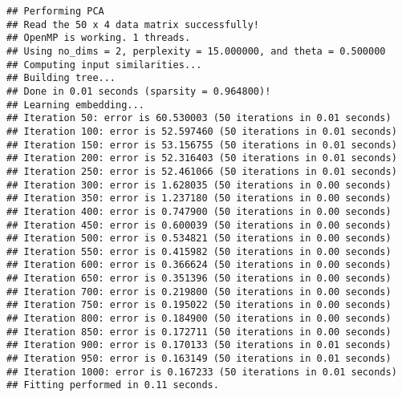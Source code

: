 \documentclass[
]{article}
\begin{document}
\begin{verbatim}
## Performing PCA
## Read the 50 x 4 data matrix successfully!
## OpenMP is working. 1 threads.
## Using no_dims = 2, perplexity = 15.000000, and theta = 0.500000
## Computing input similarities...
## Building tree...
## Done in 0.01 seconds (sparsity = 0.964800)!
## Learning embedding...
## Iteration 50: error is 60.530003 (50 iterations in 0.01 seconds)
## Iteration 100: error is 52.597460 (50 iterations in 0.01 seconds)
## Iteration 150: error is 53.156755 (50 iterations in 0.01 seconds)
## Iteration 200: error is 52.316403 (50 iterations in 0.01 seconds)
## Iteration 250: error is 52.461066 (50 iterations in 0.01 seconds)
## Iteration 300: error is 1.628035 (50 iterations in 0.00 seconds)
## Iteration 350: error is 1.237180 (50 iterations in 0.00 seconds)
## Iteration 400: error is 0.747900 (50 iterations in 0.00 seconds)
## Iteration 450: error is 0.600039 (50 iterations in 0.00 seconds)
## Iteration 500: error is 0.534821 (50 iterations in 0.00 seconds)
## Iteration 550: error is 0.415982 (50 iterations in 0.00 seconds)
## Iteration 600: error is 0.366624 (50 iterations in 0.00 seconds)
## Iteration 650: error is 0.351396 (50 iterations in 0.00 seconds)
## Iteration 700: error is 0.219800 (50 iterations in 0.00 seconds)
## Iteration 750: error is 0.195022 (50 iterations in 0.00 seconds)
## Iteration 800: error is 0.184900 (50 iterations in 0.00 seconds)
## Iteration 850: error is 0.172711 (50 iterations in 0.00 seconds)
## Iteration 900: error is 0.170133 (50 iterations in 0.01 seconds)
## Iteration 950: error is 0.163149 (50 iterations in 0.01 seconds)
## Iteration 1000: error is 0.167233 (50 iterations in 0.01 seconds)
## Fitting performed in 0.11 seconds.
\end{verbatim}
\end{document}
